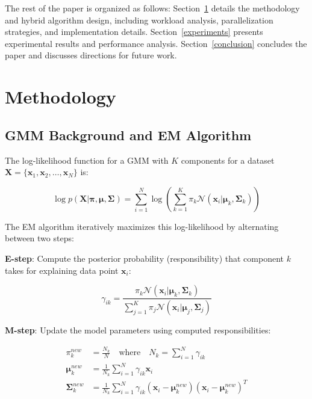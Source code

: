 \documentclass[conference]{IEEEtran}
\begin{document}
The rest of the paper is organized as follows: Section~\ref{methodology} details the methodology and hybrid algorithm design, including workload analysis, parallelization strategies, and implementation details. Section~\ref{experiments} presents experimental results and performance analysis. Section~\ref{conclusion} concludes the paper and discusses directions for future work.

\section{Methodology}
\label{methodology}

\subsection{GMM Background and EM Algorithm}

The log-likelihood function for a GMM with $K$ components for a dataset $\mathbf{X} = \{\mathbf{x}_1, \mathbf{x}_2, \ldots, \mathbf{x}_N\}$ is:

\begin{equation}
\log p(\mathbf{X}|\boldsymbol{\pi}, \boldsymbol{\mu}, \boldsymbol{\Sigma}) = \sum_{i=1}^{N} \log \left( \sum_{k=1}^{K} \pi_k \mathcal{N}(\mathbf{x}_i|\boldsymbol{\mu}_k, \boldsymbol{\Sigma}_k) \right)
\end{equation}

The EM algorithm iteratively maximizes this log-likelihood by alternating between two steps:

\textbf{E-step}: Compute the posterior probability (responsibility) that component $k$ takes for explaining data point $\mathbf{x}_i$:

\begin{equation}
\gamma_{ik} = \frac{\pi_k \mathcal{N}(\mathbf{x}_i|\boldsymbol{\mu}_k, \boldsymbol{\Sigma}_k)}{\sum_{j=1}^{K} \pi_j \mathcal{N}(\mathbf{x}_i|\boldsymbol{\mu}_j, \boldsymbol{\Sigma}_j)}
\end{equation}

\textbf{M-step}: Update the model parameters using computed responsibilities:

\begin{align}
\pi_k^{new} &= \frac{N_k}{N} \quad \text{where} \quad N_k = \sum_{i=1}^{N} \gamma_{ik} \\
\boldsymbol{\mu}_k^{new} &= \frac{1}{N_k} \sum_{i=1}^{N} \gamma_{ik} \mathbf{x}_i \\
\boldsymbol{\Sigma}_k^{new} &= \frac{1}{N_k} \sum_{i=1}^{N} \gamma_{ik} (\mathbf{x}_i - \boldsymbol{\mu}_k^{new})(\mathbf{x}_i - \boldsymbol{\mu}_k^{new})^T
\end{align}
\end{document}
